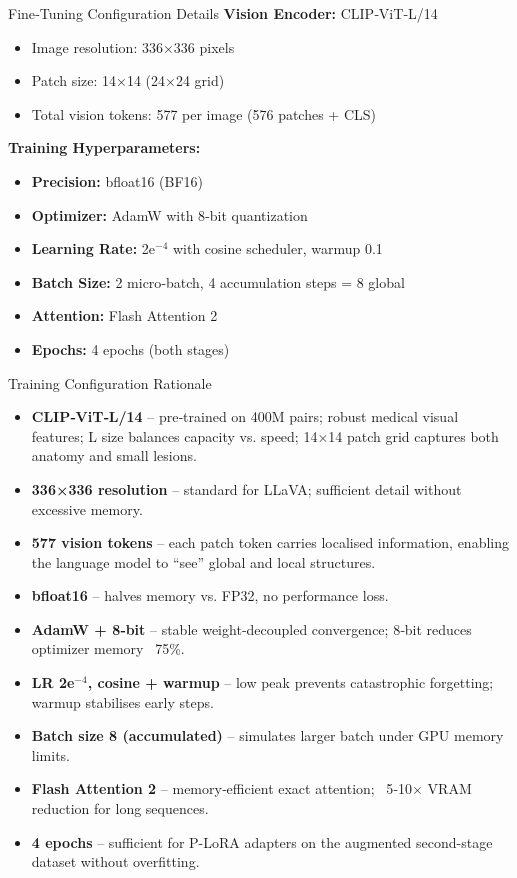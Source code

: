 ﻿\documentclass[aspectratio=169]{beamer}
\begin{document}
\begin{frame}{Fine‑Tuning Configuration Details}
\textbf{Vision Encoder:} CLIP‑ViT‑L/14
\begin{itemize}
    \item Image resolution: 336×336 pixels
    \item Patch size: 14×14 (24×24 grid)
    \item Total vision tokens: 577 per image (576 patches + CLS)
\end{itemize}

\vspace{0.8em}
\textbf{Training Hyperparameters:}
\begin{itemize}
    \item \textbf{Precision:} bfloat16 (BF16)
    \item \textbf{Optimizer:} AdamW with 8‑bit quantization
    \item \textbf{Learning Rate:} 2e$^{-4}$ with cosine scheduler, warmup 0.1
    \item \textbf{Batch Size:} 2 micro‑batch, 4 accumulation steps = 8 global
    \item \textbf{Attention:} Flash Attention 2
    \item \textbf{Epochs:} 4 epochs (both stages)
\end{itemize}
\end{frame}

\begin{frame}{Training Configuration Rationale}
\begin{itemize}
    \item \textbf{CLIP‑ViT‑L/14} – pre‑trained on 400M pairs; robust medical visual features; L size balances capacity vs. speed; 14×14 patch grid captures both anatomy and small lesions.
    \item \textbf{336×336 resolution} – standard for LLaVA; sufficient detail without excessive memory.
    \item \textbf{577 vision tokens} – each patch token carries localised information, enabling the language model to ``see'' global and local structures.
    \item \textbf{bfloat16} – halves memory vs. FP32, no performance loss.
    \item \textbf{AdamW + 8‑bit} – stable weight‑decoupled convergence; 8‑bit reduces optimizer memory ~75\%.
    \item \textbf{LR 2e$^{-4}$, cosine + warmup} – low peak prevents catastrophic forgetting; warmup stabilises early steps.
    \item \textbf{Batch size 8 (accumulated)} – simulates larger batch under GPU memory limits.
    \item \textbf{Flash Attention 2} – memory‑efficient exact attention; ~5‑10× VRAM reduction for long sequences.
    \item \textbf{4 epochs} – sufficient for P-LoRA adapters on the augmented second-stage dataset without overfitting.
\end{itemize}
\end{frame}
\end{document}
